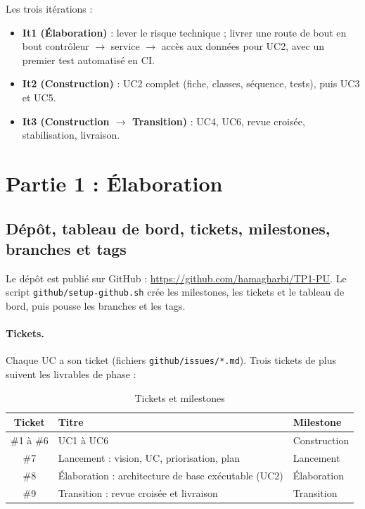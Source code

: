 \documentclass[11pt,a4paper]{article}
\begin{document}
\noindent Les trois itérations :
\begin{itemize}
  \item \textbf{It1 (Élaboration)} : lever le risque technique ; livrer une route
        de bout en bout contrôleur $\rightarrow$ service $\rightarrow$ accès aux
        données pour UC2, avec un premier test automatisé en CI.
  \item \textbf{It2 (Construction)} : UC2 complet (fiche, classes, séquence, tests),
        puis UC3 et UC5.
  \item \textbf{It3 (Construction $\rightarrow$ Transition)} : UC4, UC6, revue croisée,
        stabilisation, livraison.
\end{itemize}

\section{Partie 1 : Élaboration}

\subsection{Dépôt, tableau de bord, tickets, milestones, branches et tags}

Le dépôt est publié sur GitHub : \url{https://github.com/hamagharbi/TP1-PU}. Le
script \texttt{github/setup-github.sh} crée les milestones, les tickets et le
tableau de bord, puis pousse les branches et les tags.

\paragraph{Tickets.} Chaque UC a son ticket (fichiers \texttt{github/issues/*.md}).
Trois tickets de plus suivent les livrables de phase :

\begin{table}[H]
\centering
\begin{tabular}{c l l}
\toprule
\textbf{Ticket} & \textbf{Titre} & \textbf{Milestone} \\
\midrule
\#1 à \#6 & UC1 à UC6 & Construction \\
\#7 & Lancement : vision, UC, priorisation, plan & Lancement \\
\#8 & Élaboration : architecture de base exécutable (UC2) & Élaboration \\
\#9 & Transition : revue croisée et livraison & Transition \\
\bottomrule
\end{tabular}
\caption{Tickets et milestones}
\end{table}
\end{document}
